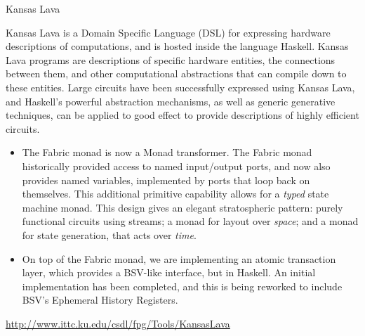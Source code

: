 \begin{hcarentry}{Kansas Lava}
\label{klava}
\makeheader

Kansas Lava is a Domain Specific Language (DSL) for expressing
hardware descriptions of computations, and is hosted inside the
language Haskell. Kansas Lava programs are descriptions of specific hardware
entities, the connections between them, and other computational abstractions
that can compile down to these entities. Large circuits have been successfully
expressed using Kansas Lava, and Haskell's powerful abstraction mechanisms, as
well as generic generative techniques, can be applied to good effect to provide
descriptions of highly efficient circuits.

\begin{itemize}

\item The Fabric monad is now a Monad transformer.
The Fabric monad historically provided access to named input/output ports,
and now also provides named variables, implemented by ports that loop back on
themselves. This additional primitive capability allows for a {\em typed\/}
state machine monad.
This design gives an elegant stratospheric pattern: purely functional circuits using streams;
a monad for layout over {\em space\/}; and a monad for state generation,
that acts over {\em time\/}.

\item 
On top of the Fabric monad, we are implementing an atomic transaction
layer, which provides a BSV-like interface, but in Haskell. An initial
implementation has been completed, and this is being reworked to include
BSV's Ephemeral History Registers.
\end{itemize}

\FurtherReading
  \url{http://www.ittc.ku.edu/csdl/fpg/Tools/KansasLava}
\end{hcarentry}
